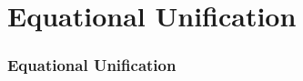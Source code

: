 \section{Equational Unification}
\begin{frame}
\frametitle{Equational Unification}
\tableofcontents 
\end{frame}